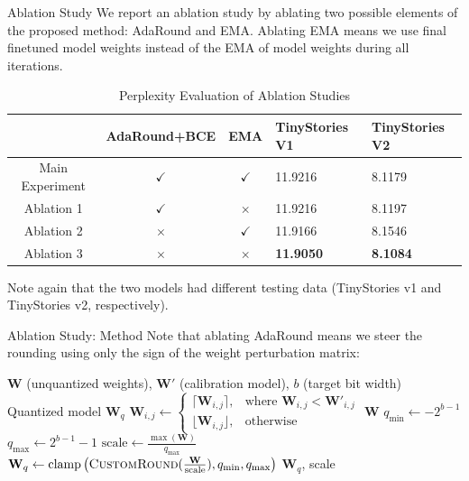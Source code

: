 \documentclass{beamer}
\begin{document}
\begin{frame}{Ablation Study}
We report an ablation study by ablating two possible elements of the proposed method: AdaRound and EMA. Ablating EMA means we use final finetuned model weights instead of the EMA of model weights during all iterations. 
\begin{table}
\centering \scriptsize
\caption{Perplexity Evaluation of Ablation Studies}
\label{tab:adaround_ablation_study}
\begin{tabular}{|c|c|c|l|l|}
\hline
& AdaRound+BCE & EMA          & TinyStories V1 & TinyStories V2  \\ \hline
Main Experiment & $\checkmark$ & $\checkmark$ & 11.9216        & 8.1179          \\ \hline
Ablation 1 & $\checkmark$ & $\times$     & 11.9216        & 8.1197          \\ \hline
Ablation 2 & $\times$     & $\checkmark$ & 11.9166        & 8.1546          \\ \hline
Ablation 3 & $\times$     & $\times$     & \textbf{11.9050}        & \textbf{8.1084} \\ \hline
\end{tabular}
\end{table}
Note again that the two models had different testing data
(TinyStories v1 and TinyStories v2, respectively).
\end{frame}
\begin{frame}{Ablation Study: Method}
Note that ablating AdaRound means we steer the rounding using only the sign of the weight perturbation matrix:
\begin{algorithm}[H] \small
\caption{Gradient-based Steering without AdaRound}\label{alg:ablate_adaround}
\begin{algorithmic}[1]
\Require $\mathbf{W}$ (unquantized weights), $\mathbf{W}'$ (calibration model), $b$ (target bit width)
\Ensure Quantized model $\mathbf{W}_q$
  \State $\mathbf{W}_{i,j} \gets \begin{cases}
    \lceil \mathbf{W}_{i, j} \rceil, &\text{where } \mathbf{W}_{i, j} < \mathbf{W}'_{i, j} \\
    \lfloor \mathbf{W}_{i, j} \rfloor, &\text{otherwise}
\end{cases}$
  \State \Return $\mathbf{W}$
\EndFunction
\State $q_{\text{min}} \gets -2^{b - 1}$
\State $q_{\text{max}} \gets 2^{b - 1} - 1$
\State $\text{scale} \gets \frac{\max(\mathbf{W})}{q_{\text{max}}}$
\State $\mathbf{W}_q \gets \text{clamp}\left(\textsc{CustomRound}(\frac{\mathbf{W}}{\text{scale}}), q_\text{min}, q_\text{max}\right)$
\State \Return $\mathbf{W}_q$, scale
\end{algorithmic}
\end{algorithm}
\end{frame}
\end{document}
